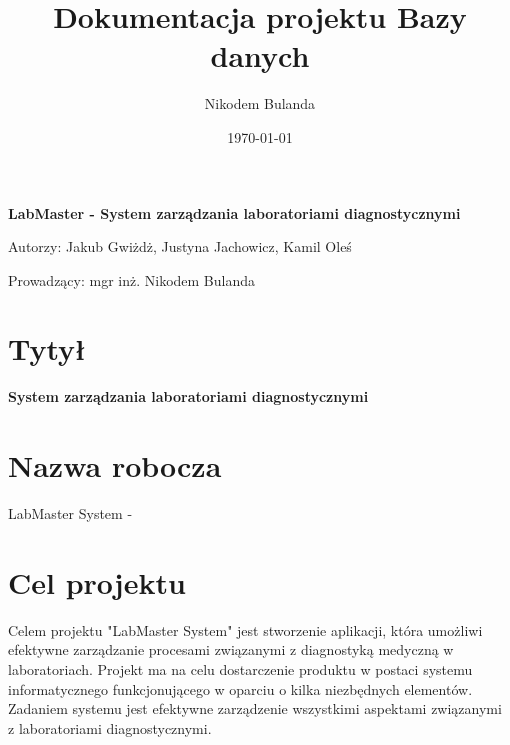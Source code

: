 \documentclass[12pt,a4paper]{article}
\begin{document}
\title{Dokumentacja projektu Bazy danych}
\author{Nikodem Bulanda}
\date{\today}

\maketitle

\begin{center}
\textbf{LabMaster - System zarządzania laboratoriami diagnostycznymi} 
\end{center}

\begin{center}
Autorzy: Jakub Gwiżdż, Justyna Jachowicz, Kamil Oleś \\
\end{center}

\begin{center}
Prowadzący: mgr inż. Nikodem Bulanda
\end{center}

\newpage

\tableofcontents
\listoftables
\listoffigures

\newpage

\section{Tytył}
\textbf{System zarządzania laboratoriami diagnostycznymi}\\

\section{Nazwa robocza}
LabMaster System - \\

\newpage
\section{Cel projektu}

\hspace{0.60cm}Celem projektu "LabMaster System" jest stworzenie aplikacji, która umożliwi efektywne zarządzanie procesami związanymi z diagnostyką medyczną w laboratoriach. Projekt ma na celu dostarczenie produktu w postaci systemu informatycznego funkcjonującego w oparciu o kilka niezbędnych elementów. Zadaniem systemu jest efektywne zarządzenie wszystkimi aspektami związanymi z laboratoriami diagnostycznymi.
\end{document}
